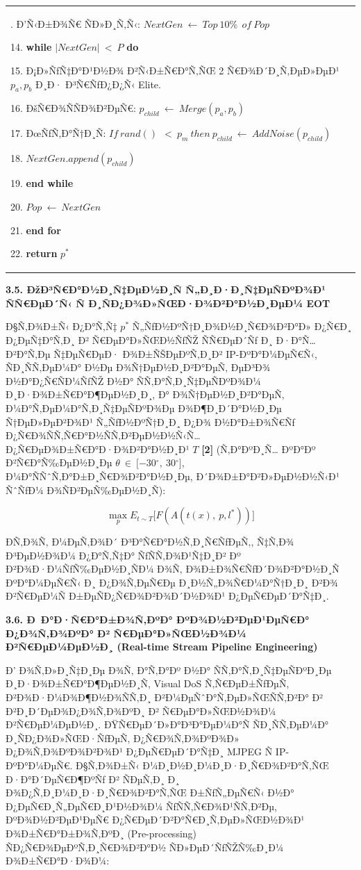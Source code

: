 \documentclass[]{article}
\begin{document}
{\begin{longtable}[]{@{}
  >{\raggedright\arraybackslash}p{}@{}}
13. Ð’Ñ‹Ð±Ð¾Ñ€ ÑÐ»Ð¸Ñ‚Ñ‹: \(NextGen\  \leftarrow \ Top\ 10\%\ \ of\ Pop\)

14. \textbf{while} \(|NextGen|\  < \ P\) \textbf{do}

15. Ð¡Ð»ÑƒÑ‡Ð°Ð¹Ð½Ð¾ Ð²Ñ‹Ð±Ñ€Ð°Ñ‚ÑŒ 2 Ñ€Ð¾Ð´Ð¸Ñ‚ÐµÐ»ÐµÐ¹ \(p_{a}{,p}_{b}\) Ð¸Ð· Ð³Ñ€ÑƒÐ¿Ð¿Ñ‹ Elite.

16. ÐšÑ€Ð¾ÑÑÐ¾Ð²ÐµÑ€: \(p_{child}\  \leftarrow \ Merge(p_{a}{,p}_{b})\)

17. ÐœÑƒÑ‚Ð°Ñ†Ð¸Ñ: \(If\ rand()\ \  < \ p_{m}\ then\ p_{child}\  \leftarrow \ AddNoise(p_{child})\)

18. \(NextGen.append(p_{child})\)

19. \textbf{end while}

20. \(Pop\  \leftarrow \ NextGen\)

21. \textbf{end for}

22. \textbf{return} \(p^{*}\) \\
\end{longtable}
}

\textbf{3.5. ÐžÐ³Ñ€Ð°Ð½Ð¸Ñ‡ÐµÐ½Ð¸Ñ Ñ„Ð¸Ð·Ð¸Ñ‡ÐµÑÐºÐ¾Ð¹ ÑÑ€ÐµÐ´Ñ‹ Ñ Ð¸ÑÐ¿Ð¾Ð»ÑŒÐ·Ð¾Ð²Ð°Ð½Ð¸ÐµÐ¼ EOT}

Ð§Ñ‚Ð¾Ð±Ñ‹ Ð¿Ð°Ñ‚Ñ‡ \(p^{*}\) Ñ„ÑƒÐ½ÐºÑ†Ð¸Ð¾Ð½Ð¸Ñ€Ð¾Ð²Ð°Ð» Ð¿Ñ€Ð¸ Ð¿ÐµÑ‡Ð°Ñ‚Ð¸ Ð² Ñ€ÐµÐ°Ð»ÑŒÐ½ÑƒÑŽ ÑÑ€ÐµÐ´Ñƒ Ð¸ Ð·Ð°Ñ…Ð²Ð°Ñ‚Ðµ Ñ‡ÐµÑ€ÐµÐ· Ð¾Ð±ÑŠÐµÐºÑ‚Ð¸Ð² IP-ÐºÐ°Ð¼ÐµÑ€Ñ‹, ÑÐ¸ÑÑ‚ÐµÐ¼Ð° Ð½Ðµ Ð¾Ñ†ÐµÐ½Ð¸Ð²Ð°ÐµÑ‚ ÐµÐ³Ð¾ Ð½Ð°Ð¿Ñ€ÑÐ¼ÑƒÑŽ Ð½Ð° ÑÑ‚Ð°Ñ‚Ð¸Ñ‡ÐµÑÐºÐ¾Ð¼ Ð¸Ð·Ð¾Ð±Ñ€Ð°Ð¶ÐµÐ½Ð¸Ð¸, Ð° Ð¾Ñ†ÐµÐ½Ð¸Ð²Ð°ÐµÑ‚ Ð¼Ð°Ñ‚ÐµÐ¼Ð°Ñ‚Ð¸Ñ‡ÐµÑÐºÐ¾Ðµ Ð¾Ð¶Ð¸Ð´Ð°Ð½Ð¸Ðµ Ñ†ÐµÐ»ÐµÐ²Ð¾Ð¹ Ñ„ÑƒÐ½ÐºÑ†Ð¸Ð¸ Ð¿Ð¾ Ð½Ð°Ð±Ð¾Ñ€Ñƒ Ð¿Ñ€Ð¾ÑÑ‚Ñ€Ð°Ð½ÑÑ‚Ð²ÐµÐ½Ð½Ñ‹Ñ… Ð¿Ñ€ÐµÐ¾Ð±Ñ€Ð°Ð·Ð¾Ð²Ð°Ð½Ð¸Ð¹ \(T\) \textbf{{[}2{]}} (Ñ‚Ð°ÐºÐ¸Ñ… ÐºÐ°Ðº Ð²Ñ€Ð°Ñ‰ÐµÐ½Ð¸Ðµ \(\theta\  \in \ \lbrack - 30{^\circ},\ 30{^\circ}\rbrack\), Ð¼Ð°ÑÑˆÑ‚Ð°Ð±Ð¸Ñ€Ð¾Ð²Ð°Ð½Ð¸Ðµ, Ð´Ð¾Ð±Ð°Ð²Ð»ÐµÐ½Ð½Ñ‹Ð¹ ÑˆÑƒÐ¼ Ð¾ÑÐ²ÐµÑ‰ÐµÐ½Ð¸Ñ):

\[\max_{p}E_{t\sim T}\lbrack F(A(t(x),\ p,l^{*}))\rbrack\]

Ð­Ñ‚Ð¾Ñ‚ Ð¼ÐµÑ‚Ð¾Ð´ Ð³Ð°Ñ€Ð°Ð½Ñ‚Ð¸Ñ€ÑƒÐµÑ‚, Ñ‡Ñ‚Ð¾ Ð³ÐµÐ½Ð¾Ð¼ Ð¿Ð°Ñ‚Ñ‡Ð° ÑƒÑÑ‚Ð¾Ð¹Ñ‡Ð¸Ð² Ðº Ð²Ð¾Ð·Ð¼ÑƒÑ‰ÐµÐ½Ð¸ÑÐ¼ Ð¾Ñ‚ Ð¾Ð±Ð¾Ñ€ÑƒÐ´Ð¾Ð²Ð°Ð½Ð¸Ñ ÐºÐ°Ð¼ÐµÑ€Ñ‹ Ð¸ Ð¿Ð¾Ñ‚ÐµÑ€Ðµ Ð¸Ð½Ñ„Ð¾Ñ€Ð¼Ð°Ñ†Ð¸Ð¸ Ð²Ð¾ Ð²Ñ€ÐµÐ¼Ñ Ð±ÐµÑÐ¿Ñ€Ð¾Ð²Ð¾Ð´Ð½Ð¾Ð¹ Ð¿ÐµÑ€ÐµÐ´Ð°Ñ‡Ð¸.\textbf{\hfill\break
}

\textbf{3.6. Ð Ð°Ð·Ñ€Ð°Ð±Ð¾Ñ‚ÐºÐ° ÐºÐ¾Ð½Ð²ÐµÐ¹ÐµÑ€Ð° Ð¿Ð¾Ñ‚Ð¾ÐºÐ° Ð² Ñ€ÐµÐ°Ð»ÑŒÐ½Ð¾Ð¼ Ð²Ñ€ÐµÐ¼ÐµÐ½Ð¸ (Real-time Stream Pipeline Engineering)}

Ð’ Ð¾Ñ‚Ð»Ð¸Ñ‡Ð¸Ðµ Ð¾Ñ‚ Ð°Ñ‚Ð°Ðº Ð½Ð° ÑÑ‚Ð°Ñ‚Ð¸Ñ‡ÐµÑÐºÐ¸Ðµ Ð¸Ð·Ð¾Ð±Ñ€Ð°Ð¶ÐµÐ½Ð¸Ñ, Visual DoS Ñ‚Ñ€ÐµÐ±ÑƒÐµÑ‚ Ð²Ð¾Ð·Ð¼Ð¾Ð¶Ð½Ð¾ÑÑ‚Ð¸ Ð²Ð¼ÐµÑˆÐ°Ñ‚ÐµÐ»ÑŒÑÑ‚Ð²Ð° Ð² Ð²Ð¸Ð´ÐµÐ¾Ð¿Ð¾Ñ‚Ð¾ÐºÐ¸ Ð² Ñ€ÐµÐ°Ð»ÑŒÐ½Ð¾Ð¼ Ð²Ñ€ÐµÐ¼ÐµÐ½Ð¸. ÐŸÑ€ÐµÐ´Ð»Ð°Ð³Ð°ÐµÐ¼Ð°Ñ ÑÐ¸ÑÑ‚ÐµÐ¼Ð° Ð¸ÑÐ¿Ð¾Ð»ÑŒÐ·ÑƒÐµÑ‚ Ð¿Ñ€Ð¾Ñ‚Ð¾ÐºÐ¾Ð» Ð¿Ð¾Ñ‚Ð¾ÐºÐ¾Ð²Ð¾Ð¹ Ð¿ÐµÑ€ÐµÐ´Ð°Ñ‡Ð¸ MJPEG Ñ IP-ÐºÐ°Ð¼ÐµÑ€. Ð§Ñ‚Ð¾Ð±Ñ‹ Ð¼Ð¸Ð½Ð¸Ð¼Ð¸Ð·Ð¸Ñ€Ð¾Ð²Ð°Ñ‚ÑŒ Ð·Ð°Ð´ÐµÑ€Ð¶ÐºÑƒ Ð² ÑÐµÑ‚Ð¸ Ð¸ Ð¾Ð¿Ñ‚Ð¸Ð¼Ð¸Ð·Ð¸Ñ€Ð¾Ð²Ð°Ñ‚ÑŒ Ð±ÑƒÑ„ÐµÑ€Ñ‹ Ð½Ð° Ð¿ÐµÑ€Ð¸Ñ„ÐµÑ€Ð¸Ð¹Ð½Ð¾Ð¼ ÑƒÑÑ‚Ñ€Ð¾Ð¹ÑÑ‚Ð²Ðµ, ÐºÐ¾Ð½Ð²ÐµÐ¹ÐµÑ€ Ð¿Ñ€ÐµÐ´Ð²Ð°Ñ€Ð¸Ñ‚ÐµÐ»ÑŒÐ½Ð¾Ð¹ Ð¾Ð±Ñ€Ð°Ð±Ð¾Ñ‚ÐºÐ¸ (Pre-processing) ÑÐ¿Ñ€Ð¾ÐµÐºÑ‚Ð¸Ñ€Ð¾Ð²Ð°Ð½ ÑÐ»ÐµÐ´ÑƒÑŽÑ‰Ð¸Ð¼ Ð¾Ð±Ñ€Ð°Ð·Ð¾Ð¼:
\end{document}
